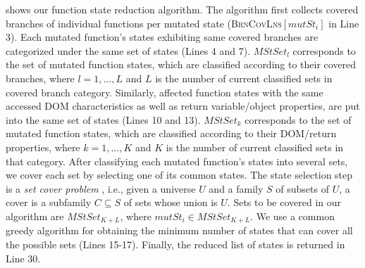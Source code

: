  shows our function state reduction algorithm. The algorithm first collects covered branches of individual functions per mutated state (\textsc{BrnCovLns}$[mutSt_i]$ in Line 3). Each mutated function's states exhibiting same covered branches are categorized under the same set of states (Lines 4 and 7). $MStSet_{l}$ corresponds to the set of mutated function states, which are classified according to their covered branches, where $l={1,...,L}$ and $L$ is the number of current classified sets in covered branch category. Similarly, affected function states with the same accessed DOM characteristics as well as return variable/object properties, are put into the same set of states (Lines 10 and 13). $MStSet_{k}$ corresponds to the set of mutated function states, which are classified according to their DOM/return properties, where $k={1,...,K}$ and $K$ is the number of current classified sets in that category.  After classifying each mutated function's states into several sets, we cover each set by selecting one of its common states.
The state selection step is a \emph{set cover problem} \cite{Cormen:2001}, i.e., given a universe $U$ and a family $S$ of subsets of $U$, a cover is a subfamily $C \subseteq S$ of sets whose union is $U$.
Sets to be covered in our algorithm are $MStSet_{K+L}$, where $mutSt_i \in MStSet_{K+L}$. We use a common greedy algorithm for obtaining the minimum number of states that can cover all the possible sets (Lines 15-17). 
Finally, the reduced list of states is returned in Line 30.          
 
 

  
     